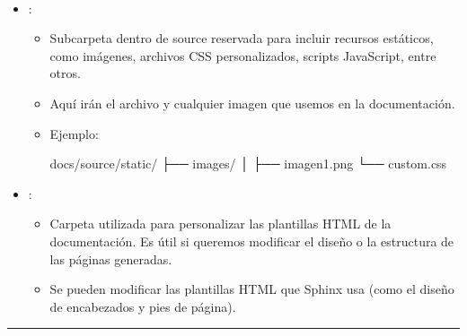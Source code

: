 \documentclass[a4paper,10pt,spanish]{sphinxmanual}
\begin{document}
\paragraph{}
\label{\detokenize{configuracion_inicial/004.estructura_inicial_proyecto:subcarpetas-importantes}}\begin{itemize}
\item {} 
\sphinxAtStartPar
{}:
\begin{itemize}
\item {} 
\sphinxAtStartPar
Subcarpeta dentro de source reservada para incluir recursos estáticos, como imágenes, archivos CSS personalizados, scripts JavaScript, entre otros.

\item {} 
\sphinxAtStartPar
Aquí irán el archivo  y cualquier imagen que usemos en la documentación.

\item {} 
\sphinxAtStartPar
Ejemplo:

\begin{sphinxVerbatim}[commandchars=\\\{\}]
docs/source/\PYGZus{}static/
├── images/
│   ├── imagen1.png
└── custom.css 
\end{sphinxVerbatim}

\end{itemize}

\item {} 
\sphinxAtStartPar
{}:
\begin{itemize}
\item {} 
\sphinxAtStartPar
Carpeta utilizada para personalizar las plantillas HTML de la documentación. Es útil si queremos modificar el diseño o la estructura de las páginas generadas.

\item {} 
\sphinxAtStartPar
Se pueden modificar las plantillas HTML que Sphinx usa (como el diseño de encabezados y pies de página).

\end{itemize}

\end{itemize}


\bigskip\hrule\bigskip
\end{document}
